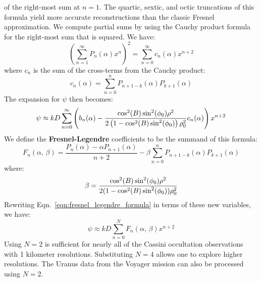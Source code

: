 \documentclass{article}
\begin{document}
        of the right-most sum at $n=1$. The quartic, sextic, and octic
        truncations of this formula yield more
        accurate reconstructions than the classic Fresnel approximation. We
        compute partial sums by using the Cauchy product formula for the
        right-most sum that is squared. We have:
        \begin{equation}
            \left(\sum_{n=1}^{\infty}P_{n}(\alpha)x^{n}\right)^{2}
            =\sum_{n=0}^{\infty}c_{n}(\alpha)x^{n+2}
        \end{equation}
        where $c_{n}$ is the sum of the cross-terms from the Cauchy product:
        \begin{equation}
            c_{n}(\alpha)=\sum_{n=0}^{n}P_{n+1-k}(\alpha)P_{k+1}(\alpha)
        \end{equation}
        The expansion for $\psi$ then becomes:
        \begin{equation}
            \label{eqn:fresnel_legendre_formula}
            \psi\approx
            kD\sum_{n=0}^{\infty}\left(
                b_{n}(\alpha)-
                \frac{%
                    \cos^{2}(B)\sin^{2}(\phi_{0})\rho^{2}
                }{%
                    2\left(1-\cos^{2}(B)\sin^{2}(\phi_{0})\right)
                    \rho_{0}^{2}
                }
                c_{n}(\alpha)
            \right)x^{n+2}
        \end{equation}
        We define the \textbf{Fresnel-Legendre} coefficients to be the
        summand of this formula:
        \begin{equation}
            \label{eqn:fresnel_legendre_coeffs}
            F_{n}(\alpha,\,\beta)
            =\frac{P_{n}(\alpha)-\alpha{P}_{n+1}(\alpha)}{n+2}
                -\beta\sum_{n=0}^{n}P_{n+1-k}(\alpha)P_{k+1}(\alpha)
        \end{equation}
        where:
        \begin{equation}
            \beta=
            \frac{%
                \cos^{2}(B)\sin^{2}(\phi_{0})\rho^{2}
            }{%
                2(1-\cos^{2}(B)\sin^{2}(\phi_{0}))\rho_{0}^{2}
            }
        \end{equation}
        Rewriting Eqn.~\ref{eqn:fresnel_legendre_formula} in terms of
        these new variables, we have:
        \begin{equation}
            \psi\approx{k}D\sum_{n=0}^{N}F_{n}(\alpha,\,\beta)x^{n+2}
        \end{equation}
        Using $N=2$ is sufficient for nearly all of the Cassini occultation
        observations with 1 kilometer resolutions. Substituting $N=4$
        allows one to explore higher resolutions. The Uranus data from the
        Voyager mission can also be processed using $N=2$.
\end{document}
